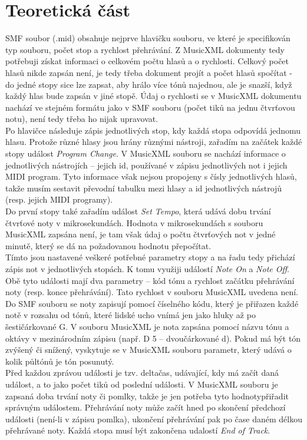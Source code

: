 \documentclass[12pt,a4paper,titlepage]{article}
\begin{document}
\section{Teoretická část}
SMF soubor (.mid) obsahuje nejprve hlavičku souboru, ve které je specifikován typ souboru, počet stop a rychlost přehrávání. Z MusicXML dokumenty tedy potřebuji získat informaci o celkovém počtu hlasů a o rychlosti. Celkový počet hlasů nikde zapsán není, je tedy třeba dokument projít a počet hlasů spočítat - do jedné stopy sice lze zapsat, aby hrálo více tónů najednou, ale je snazší, když každý hlas bude zapsán v jiné stopě. Údaj o rychlosti se v MusicXML dokumentu nachází ve stejném formátu jako v SMF souboru (počet tiků na jednu čtvrťovou notu), není tedy třeba ho nijak upravovat.\\
Po hlavičce následuje zápis jednotlivých stop, kdy každá stopa odpovídá jednomu hlasu. Protože různé hlasy jsou hrány různými nástroji, zařadím na začátek každé stopy událost \emph{Program Change}. V MusicXML souboru se nachází informace o jednotlivých nástrojích -- jejich id, používané v zápisu jednotlivých not i jejich MIDI program. Tyto informace však nejsou propojeny s čísly jednotlivých hlasů, takže musím sestavit převodní tabulku mezi hlasy a id jednotlivých nástrojů (resp. jejich MIDI programy).\\
Do první stopy také zařadím událost \emph{Set Tempo}, která udává dobu trvání čtvrťové noty v mikrosekundách. Hodnota v mikrosekundách s souboru MusicXML zapsána není, je tam však údaj o počtu čtvrťových not v jedné minutě, který se dá na požadovanou hodnotu přepočítat.\\
Tímto jsou nastavené veškeré potřebné parametry stopy a na řadu tedy přichází zápis not v jednotlivých stopách. K tomu využiji událostí \emph{Note On} a \emph{Note Off}. Obě tyto události mají dva parametry -- kód tónu a rychlost začátku přehrávání noty (resp. konce přehrávání). Tato rychlost v souboru MusicXML uvedena není. Do SMF souboru se noty zapisují pomocí číselného kódu, který je přiřazen každé notě v rozsahu od tónů, které lidské ucho vnímá jen jako hluky až po šestičárkované G. V souboru MusicXML je nota zapsána pomocí názvu tónu a oktávy v mezinárodním zápisu (např. D 5 -- dvoučárkované d). Pokud má být tón zvýšený či snížený, vyskytuje se v MusicXML souboru parametr, který udává o kolik půltónů je tón posunutý.\\
Před každou zprávou události je tzv. deltačas, udávající, kdy má začít daná událost, a to jako počet tiků od poslední události. V MusicXML souboru je zapsaná doba trvání noty či pomlky, takže je jen potřeba tyto hodnotypřiřadit správným událostem. Přehrávání noty může začít hned po skončení předchozí události (není-li v zápisu pomlka), ukončení přehrávání pak po čase daném délkou přehrávané noty. Každá stopa musí být zakončena udalostí \emph{End of Track}.\\
\end{document}
